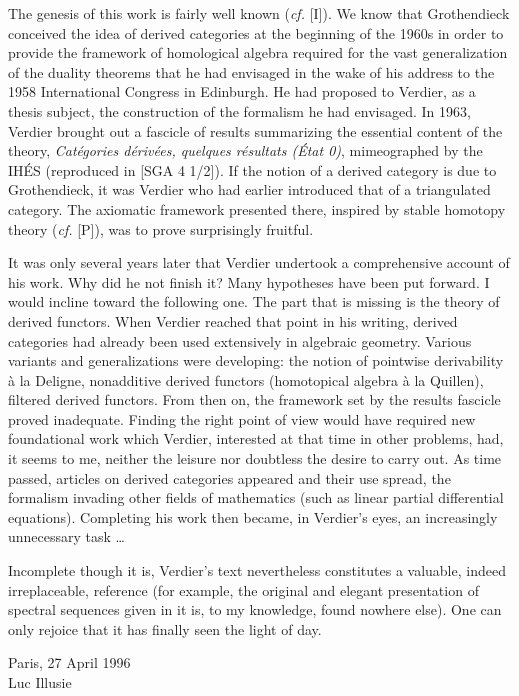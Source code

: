 The genesis of this work is fairly well known (\emph{cf.} [I]). We know that
Grothendieck conceived the idea of derived categories at the beginning of the
1960s in order to provide the framework of homological algebra required for
the vast generalization of the duality theorems that he had envisaged in the
wake of his address to the 1958 International Congress in Edinburgh. He had
proposed to Verdier, as a thesis subject, the construction of the formalism he
had envisaged. In 1963, Verdier brought out a fascicle of results summarizing
the essential content of the theory, \emph{Catégories dérivées, quelques
résultats (État 0)}, mimeographed by the IHÉS (reproduced in [SGA 4 1/2]). If
the notion of a derived category is due to Grothendieck, it was Verdier who had
earlier introduced that of a triangulated category. The axiomatic framework
presented there, inspired by stable homotopy theory (\emph{cf.} [P]), was to
prove surprisingly fruitful.

It was only several years later that Verdier undertook a comprehensive account
of his work. Why did he not finish it? Many hypotheses have been put forward.
I would incline toward the following one. The part that is missing is the
theory of derived functors. When Verdier reached that point in his writing,
derived categories had already been used extensively in algebraic geometry.
Various variants and generalizations were developing: the notion of pointwise
derivability à la Deligne, nonadditive derived functors (homotopical algebra à
la Quillen), filtered derived functors. From then on, the framework set by the
results fascicle proved inadequate. Finding the right point of view would have
required new foundational work which Verdier, interested at that time in
other problems, had, it seems to me, neither the leisure nor doubtless the
desire to carry out. As time passed, articles on derived categories appeared
and their use spread, the formalism invading other fields of mathematics
(such as linear partial differential equations). Completing his work then
became, in Verdier's eyes, an increasingly unnecessary task \ldots{}

Incomplete though it is, Verdier's text nevertheless constitutes a valuable,
indeed irreplaceable, reference (for example, the original and elegant
presentation of spectral sequences given in it is, to my knowledge, found
nowhere else). One can only rejoice that it has finally seen the light of day.

\begin{flushright}
Paris, 27 April 1996\\
Luc Illusie
\end{flushright}

